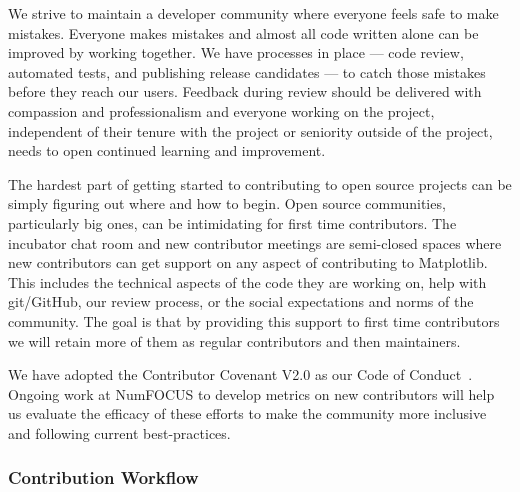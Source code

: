 \documentclass[12pt]{article}
\numberwithin{page}{section}
\begin{document}

We strive to maintain a developer community where everyone feels safe to make
mistakes. Everyone makes mistakes and almost all code written alone can be
improved by working together.  We have processes in place --- code review,
automated tests, and publishing release candidates --- to catch those mistakes
before they reach our users.  Feedback during review should be delivered with
compassion and professionalism and everyone working on the project, independent
of their tenure with the project or seniority outside of the project, needs to
open continued learning and improvement.

The hardest part of getting started to contributing to open source
projects can be simply figuring out where and how to begin.  Open source communities,
particularly big ones, can be intimidating for first time
contributors.  The incubator chat room and new contributor meetings
are semi-closed spaces where  new
contributors can get support on any aspect of contributing to
Matplotlib.  This includes the technical aspects of the code they are
working on, help with git/GitHub, our review process, or the social
expectations and norms of the community.  The goal is that by
providing this support to first time contributors we will retain more
of them as regular contributors and then maintainers.


We have adopted the Contributor Covenant V2.0 as our Code of
Conduct~\cite{CoC}.  Ongoing work at NumFOCUS to develop metrics on new
contributors will help us evaluate the efficacy of these efforts to make the
community more inclusive and following current best-practices.

\subsubsection{Contribution Workflow}
\end{document}
